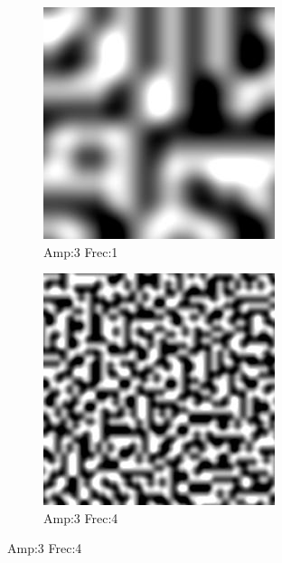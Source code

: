\begin{figure}[H]
\centering
    \begin{subfigure}{.26\textwidth}
        \centering
        \includegraphics[width=1\linewidth]{imagenes/image_generation/perlin_python_3_1.jpg}
        \caption{Amp:3 Frec:1}
    \end{subfigure}%
    \begin{subfigure}{.26\textwidth}
        \centering
        \includegraphics[width=1\linewidth]{imagenes/image_generation/perlin_python_3_4.jpg}
        \caption{Amp:3 Frec:4}
    \end{subfigure}%


\end{figure}
